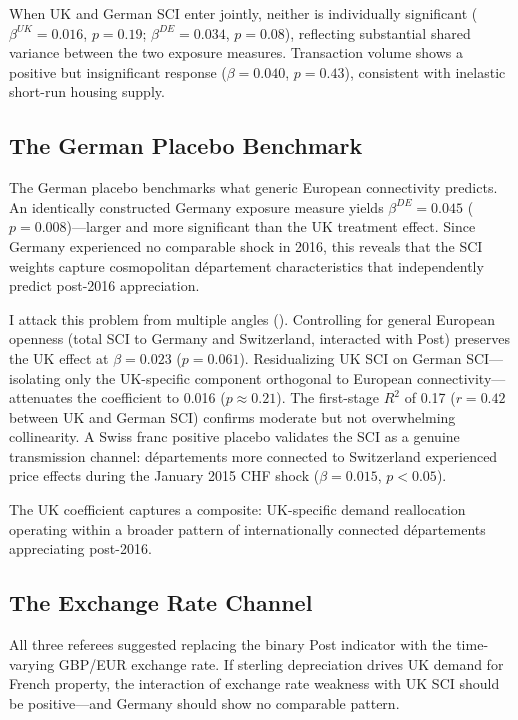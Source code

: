 \documentclass[12pt]{article}
\begin{document}
When UK and German SCI enter jointly, neither is individually significant ($\beta^{UK} = 0.016$, $p = 0.19$; $\beta^{DE} = 0.034$, $p = 0.08$), reflecting substantial shared variance between the two exposure measures. Transaction volume shows a positive but insignificant response ($\beta = 0.040$, $p = 0.43$), consistent with inelastic short-run housing supply.



\subsection{The German Placebo Benchmark}

The German placebo benchmarks what generic European connectivity predicts. An identically constructed Germany exposure measure yields $\beta^{DE} = 0.045$ ($p = 0.008$)---larger and more significant than the UK treatment effect. Since Germany experienced no comparable shock in 2016, this reveals that the SCI weights capture cosmopolitan d\'epartement characteristics that independently predict post-2016 appreciation.

I attack this problem from multiple angles (). Controlling for general European openness (total SCI to Germany and Switzerland, interacted with Post) preserves the UK effect at $\beta = 0.023$ ($p = 0.061$). Residualizing UK SCI on German SCI---isolating only the UK-specific component orthogonal to European connectivity---attenuates the coefficient to 0.016 ($p \approx 0.21$). The first-stage $R^2$ of 0.17 ($r = 0.42$ between UK and German SCI) confirms moderate but not overwhelming collinearity. A Swiss franc positive placebo validates the SCI as a genuine transmission channel: d\'epartements more connected to Switzerland experienced price effects during the January 2015 CHF shock ($\beta = 0.015$, $p < 0.05$).

The UK coefficient captures a composite: UK-specific demand reallocation operating within a broader pattern of internationally connected d\'epartements appreciating post-2016.



\subsection{The Exchange Rate Channel}

All three referees suggested replacing the binary Post indicator with the time-varying GBP/EUR exchange rate. If sterling depreciation drives UK demand for French property, the interaction of exchange rate weakness with UK SCI should be positive---and Germany should show no comparable pattern.
\end{document}
